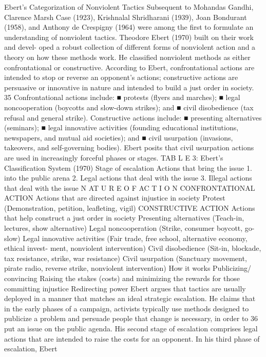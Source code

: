 \documentclass[twoside,a4paper,12pt,fleqn,openany]{extbook}
\begin{document}
Ebert’s Categorization of Nonviolent Tactics
Subsequent to Mohandas Gandhi, Clarence Marsh Case (1923), Krishnalal Shridharani (1939),
Joan Bondurant (1958), and Anthony de Crespigny (1964) were among the first to formulate
an understanding of nonviolent tactics. Theodore Ebert (1970) built on their work and devel-
oped a robust collection of different forms of nonviolent action and a theory on how these
methods work. He classified nonviolent methods as either confrontational or constructive.
According to Ebert, confrontational actions are intended to stop or reverse an opponent’s
actions; constructive actions are persuasive or innovative in nature and intended to build a
just order in society.
35
Confrontational actions include:
■
 protests (flyers and marches);
■
 legal noncooperation (boycotts and slow-down strikes); and
■
 civil disobedience (tax refusal and general strike).
Constructive actions include:
■
 presenting alternatives (seminars);
■
 legal innovative activities (founding educational institutions, newspapers, and mutual
aid societies); and
■
 civil usurpation (invasions, takeovers, and self-governing bodies). Ebert posits that civil
usurpation actions are used in increasingly forceful phases or stages.
TAB L E 3: Ebert’s Classification System (1970)
Stage of escalation
Actions that
bring the issue
1.
into the public
arena
2.
Legal actions
that deal with
the issue
3.
Illegal actions
that deal with
the issue
N AT U R E O F AC T I O N
CONFRONTATIONAL
ACTION
Actions that are directed
against injustice in society
Protest
(Demonstration, petition,
leafleting, vigil)
CONSTRUCTIVE ACTION
Actions that help construct
a just order in society
Presenting alternatives
(Teach-in, lectures,
show alternative)
Legal noncooperation
(Strike, consumer
boycott, go-slow)
Legal innovative activities
(Fair trade, free school,
alternative economy, ethical invest-
ment, nonviolent intervention)
Civil disobedience
(Sit-in, blockade,
tax resistance, strike,
war resistance)
Civil usurpation
(Sanctuary movement,
pirate radio, reverse strike,
nonviolent intervention)
How it works
Publicizing/
convincing
Raising the
stakes (costs) and
minimizing the
rewards for those
committing injustice
Redirecting power
Ebert argues that tactics are usually deployed in a manner that matches an ideal strategic
escalation. He claims that in the early phases of a campaign, activists typically use methods
designed to publicize a problem and persuade people that change is necessary, in order to
36
put an issue on the public agenda. His second stage of escalation comprises legal actions
that are intended to raise the costs for an opponent. In his third phase of escalation, Ebert
\end{document}
